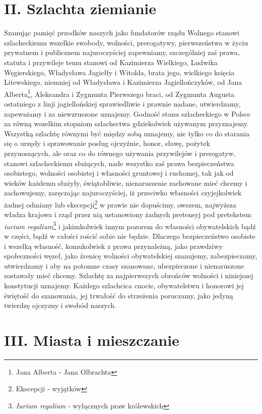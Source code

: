 \documentclass{book}
\begin{document}
 
\section*{II. Szlachta ziemianie}

 Szanując pamięć przodków naszych jako fundatorów rządu Wolnego stanowi szlacheckiemu wszelkie swobody, wolności, prerogatywy, pierwszeństwa w życiu prywatnem i publicznem najuroczyściej zapewniamy, szczególniej zaś prawa, statuta i przywileje temu stanowi od Kazimierza Wielkiego, Ludwika Węgierskiego, Władysława Jagiełły i Witolda, brata jego, wielkiego księcia Litewskiego,  niemniej od Władysława i Kazimierza Jagiellończyków, od Jana Alberta\footnote{Jana Alberta - Jana Olbrachta},  Aleksandra i Zygmunta Pierwszego braci, od Zygmunta Augusta ostatniego z linji jagiellońskiej sprawiedliwie i prawnie nadane, utwierdzamy, zapewniamy i za niewzruszone uznajemy.  Godność stanu szlacheckiego w Polsce za równą wszelkim stopniom szlachectwa gdziekolwiek używanym przyznajemy.  Wszystką szlachtę równymi być między sobą uznajemy, nie tylko co do starania się o urzędy i sprawowanie posług ojczyźnie, honor, sławę, pożytek przynoszących,  ale oraz co do równego używania przywilejów i prerogatyw, stanowi szlacheckiemu służących, nade wszystko zaś prawa bezpieczeństwa osobistego, wolności osobistej  i własności gruntowej i ruchomej, tak jak od wieków każdemu służyły, świątobliwie, nienaruszenie zachowane mieć chcemy i zachowujemy,  zaręczając najuroczyściej, iż przeciwko własności czyjejkolwiek żadnej odmiany lub ekscepcji\footnote{Ekscepcji - wyjątków}  w prawie nie dopuścimy, owszem, najwyższa władza krajowa i rząd przez nią ustanowiony żadnych pretensyj pod pretekstem \textit{iurium regalium}\footnote{\textit{Iurium regalium} - wyłącznych praw królewskich}  i jakimkolwiek innym pozorem do własności obywatelskich bądź w części, bądź w całości rościć sobie nie będzie.  Dlaczego bezpieczeństwo osobiste i wszelką własność, komukolwiek z prawa przynależną, jako prawdziwy społeczności węzeł, jako źrenicę wolności obywatelskiej szanujemy,  zabezpieczamy, utwierdzamy i aby na potomne czasy szanowane, ubezpieczone i nienaruszone zostawały mieć chcemy.  Szlachtę za najpierwszych obrońców wolności i niniejszej konstytucji uznajemy.  Każdego szlachcica cnocie, obywatelstwu i honorowi jej świętość do szanowania, jej trwałość do strzeżenia poruczamy, jako jedyną twierdzę ojczyzny i swobód naszych. 

 
\section*{III. Miasta i mieszczanie}
\end{document}
